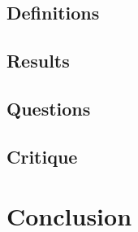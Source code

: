 \documentclass{article} %
\newcounter{source}
\begin{document}
\subsection{Definitions}






\subsection{Results}






\subsection{Questions}







\subsection{Critique}







\section{Conclusion}



\end{document}
